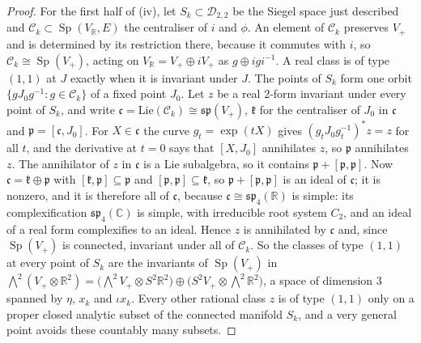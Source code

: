 \documentclass[11pt,reqno]{amsart}
\theoremstyle{plain}
\theoremstyle{definition}
\theoremstyle{remark}
\newcommand{\RR}{\mathbb{R}}
\newcommand{\CC}{\mathbb{C}}
\newcommand{\cD}{\mathcal{D}}
\DeclareMathOperator{\Sp}{Sp}
\begin{document}
\begin{proof}
For the first half of (iv), let $S_{k}\subset\cD_{2,2}$ be the Siegel space
just described and $\mathcal{C}_{k}\subset\Sp(V_{\RR},E)$ the centraliser of
$i$ and $\phi$. An element of $\mathcal{C}_{k}$ preserves $V_{+}$ and is
determined by its restriction there, because it commutes with $i$, so
$\mathcal{C}_{k}\cong\Sp(V_{+})$, acting on $V_{\RR}=V_{+}\oplus iV_{+}$ as
$g\oplus igi^{-1}$. A real class is of type $(1,1)$ at $J$ exactly when it is
invariant under $J$. The points of $S_{k}$ form one orbit
$\{gJ_{0}g^{-1}:g\in\mathcal{C}_{k}\}$ of a fixed point $J_{0}$. Let $z$ be a
real $2$-form invariant under every point of $S_{k}$, and write
$\mathfrak{c}=\mathrm{Lie}(\mathcal{C}_{k})\cong\mathfrak{sp}(V_{+})$,
$\mathfrak{k}$ for the centraliser of $J_{0}$ in $\mathfrak{c}$ and
$\mathfrak{p}=[\mathfrak{c},J_{0}]$. For $X\in\mathfrak{c}$ the curve
$g_{t}=\exp(tX)$ gives $(g_{t}J_{0}g_{t}^{-1})^{*}z=z$ for all $t$, and the
derivative at $t=0$ says that $[X,J_{0}]$ annihilates $z$, so $\mathfrak{p}$
annihilates $z$. The annihilator of $z$ in $\mathfrak{c}$ is a Lie
subalgebra, so it contains $\mathfrak{p}+[\mathfrak{p},\mathfrak{p}]$. Now
$\mathfrak{c}=\mathfrak{k}\oplus\mathfrak{p}$ with
$[\mathfrak{k},\mathfrak{p}]\subseteq\mathfrak{p}$ and
$[\mathfrak{p},\mathfrak{p}]\subseteq\mathfrak{k}$, so
$\mathfrak{p}+[\mathfrak{p},\mathfrak{p}]$ is an ideal of $\mathfrak{c}$;
it is nonzero, and it is therefore all of $\mathfrak{c}$, because
$\mathfrak{c}\cong\mathfrak{sp}_{4}(\RR)$ is simple: its complexification
$\mathfrak{sp}_{4}(\CC)$ is simple, with irreducible root system $C_{2}$, and
an ideal of a real form complexifies to an ideal. Hence $z$ is annihilated by
$\mathfrak{c}$ and, since $\Sp(V_{+})$ is connected, invariant under all of
$\mathcal{C}_{k}$. So the classes of type $(1,1)$ at every point of $S_{k}$
are the invariants of $\Sp(V_{+})$ in $\bigwedge^{2}(V_{+}\otimes\RR^{2})
=\bigl(\bigwedge^{2}V_{+}\otimes S^{2}\RR^{2}\bigr)
\oplus\bigl(S^{2}V_{+}\otimes\bigwedge^{2}\RR^{2}\bigr)$, a space of dimension
$3$ spanned by $\eta$, $x_{k}$ and $\iota x_{k}$. Every other rational
class $z$ is of type $(1,1)$ only on a proper closed analytic subset of the
connected manifold $S_{k}$, and a very general point avoids these countably
many subsets.


\end{proof}
\end{document}
